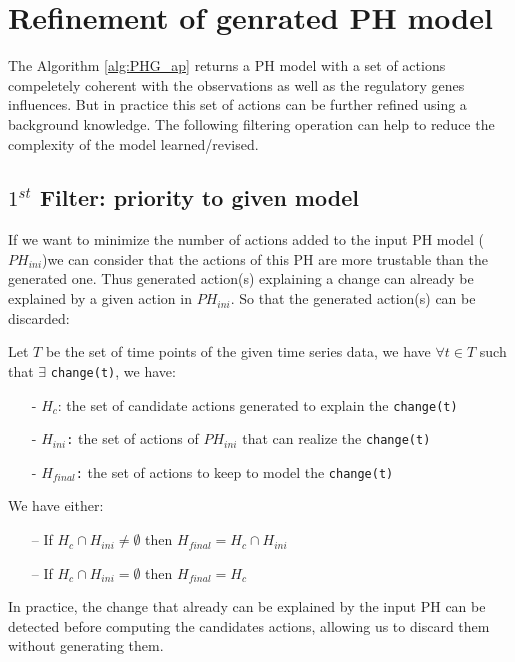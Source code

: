 \section{Refinement of genrated PH model }
The Algorithm \ref{alg:PHG_ap} returns a PH model with a set of actions compeletely coherent with the observations as well as the regulatory genes influences.
But in practice this set of actions can be further refined using a background knowledge.
The following filtering operation can help to reduce the complexity of the model learned/revised.

\subsection{$1^{st}$ Filter: priority to given model}

If we want to minimize the number of actions added to the input PH  model ($PH_{ini}$)we can consider that the actions of this PH are more trustable than the generated one. Thus generated action(s) explaining a change can already be explained by a given action in $PH_{ini}$. So that the generated action(s) can be discarded:\\
\begin{definition}
Let $T$ be the set of time points of the given time series data, we have $\forall t \in T$ such that $\exists$  \texttt{change(t)}, we have:
\begin{itemize}
\item[-] \texttt{$H_c$}: the set of candidate actions generated to explain the \texttt{change(t)}
\item[-] \texttt{$H_{ini}$:} the set of actions of $PH_{ini}$ that can realize the \texttt{change(t)}
\item[-] \texttt{$H_{final}$:} the set of actions to keep to model the \texttt{change(t)}
\end{itemize}
We have either:
\begin{itemize}
\item[--] If $H_c \cap H_{ini} \neq \emptyset $ then $H_{final}= H_c \cap H_{ini}$ 
\item[--] If $H_c \cap H_{ini} = \emptyset $ then $H_{final}=H_c$
\end{itemize}
\end{definition}
In practice, the change that already can be explained by the input PH can be detected before computing the candidates actions, allowing us to discard them without generating them.

